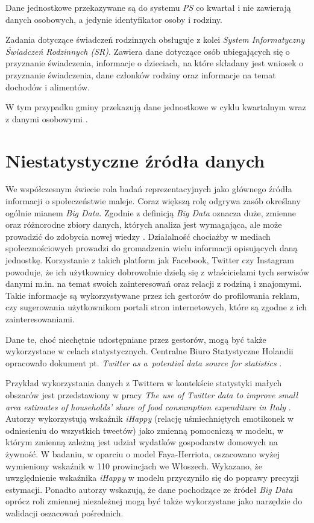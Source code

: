 Dane jednostkowe przekazywane są do systemu \textit{PS} co kwartał i nie zawierają danych osobowych, a jedynie identyfikator osoby i rodziny.

Zadania dotyczące świadczeń rodzinnych obsługuje z kolei \textit{System Informatyczny Świadczeń Rodzinnych (SR)}. Zawiera dane dotyczące osób ubiegających się o przyznanie świadczenia, informacje o dzieciach, na które składany jest wniosek o przyznanie świadczenia, dane członków rodziny oraz informacje na temat dochodów i alimentów. 

W tym przypadku gminy przekazują dane jednostkowe w cyklu kwartalnym wraz z danymi osobowymi \citep{rej2013}. 

\section{Niestatystyczne źródła danych}

We współczesnym świecie rola badań reprezentacyjnych jako głównego źródła informacji o społeczeństwie maleje. Coraz większą rolę odgrywa zasób określany ogólnie mianem \textit{Big Data}. Zgodnie z definicją \textit{Big Data} oznacza duże, zmienne oraz różnorodne zbiory danych, których analiza jest wymagająca, ale może prowadzić do zdobycia nowej wiedzy \citep{beresewicz2015}. Działalność chociażby w mediach społecznościowych prowadzi do gromadzenia wielu informacji opisujących daną jednostkę. Korzystanie z takich platform jak Facebook, Twitter czy Instagram powoduje, że ich użytkownicy dobrowolnie dzielą się z właścicielami tych serwisów danymi m.in. na temat swoich zainteresowań oraz relacji z rodziną i znajomymi. Takie informacje są wykorzystywane przez ich gestorów do profilowania reklam, czy sugerowania użytkownikom portali stron internetowych, które są zgodne z ich zainteresowaniami. 

Dane te, choć niechętnie udostępniane przez gestorów, mogą być także wykorzystane w celach statystycznych. Centralne Biuro Statystyczne Holandii opracowało dokument pt. \textit{Twitter as a~potential data source for statistics} \citep{twitter2012}.

Przykład wykorzystania danych z Twittera w kontekście statystyki małych obszarów jest przedstawiony w pracy \textit{The use of Twitter data to improve small area estimates of households’ share of food consumption expenditure in Italy} \citep{marchetti2016}. Autorzy wykorzystują wskaźnik \textit{iHappy} (relację uśmiechniętych emotikonek w odniesieniu do wszystkich tweetów) jako zmienną pomocniczą w modelu, w którym zmienną zależną jest udział wydatków gospodarstw domowych na żywność. W badaniu, w oparciu o model Faya-Herriota, oszacowano wyżej wymieniony wskaźnik w 110 prowincjach we Włoszech. Wykazano, że uwzględnienie wskaźnika \textit{iHappy} w modelu przyczyniło się do poprawy precyzji estymacji. Ponadto autorzy wskazują, że dane pochodzące ze źródeł \textit{Big Data} oprócz roli zmiennej niezależnej mogą być także wykorzystane jako narzędzie do walidacji oszacowań pośrednich.

